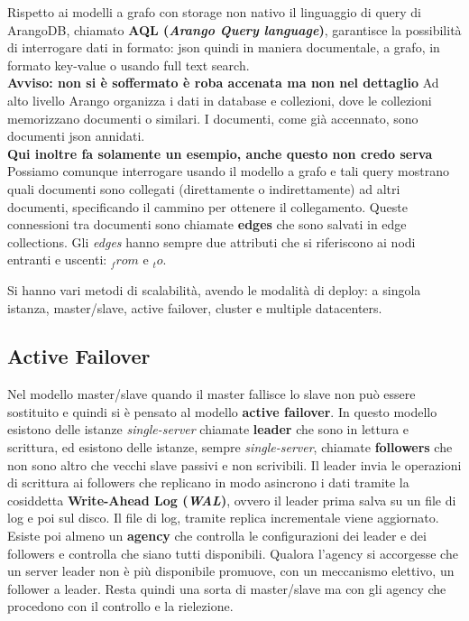 Rispetto ai modelli a grafo con storage non nativo il linguaggio di query di ArangoDB, chiamato \textbf{AQL (\textit{Arango Query language})}, garantisce la possibilità di interrogare dati in formato: json quindi in maniera documentale, a grafo, in formato key-value o  usando full text search. \\

\textbf{Avviso: non si è soffermato è roba accenata ma non nel dettaglio}
Ad alto livello Arango organizza i dati in database e collezioni, dove le collezioni memorizzano documenti o similari. I documenti, come già accennato, sono documenti json annidati.\\
\textbf{Qui inoltre fa solamente un esempio, anche questo non credo serva}\\
Possiamo comunque interrogare usando il modello a grafo e tali query mostrano quali documenti sono collegati (direttamente o indirettamente) ad altri documenti, specificando il cammino per ottenere il collegamento. Queste connessioni tra documenti sono chiamate \textbf{edges} che sono salvati in edge collections. Gli \textit{edges} hanno sempre due attributi che si riferiscono ai nodi entranti e uscenti: $_from $ e $_to$.

Si hanno vari metodi di scalabilità, avendo le modalità di deploy: a singola istanza, master/slave, active failover, cluster e multiple datacenters.

\subsection{Active Failover}
Nel modello master/slave quando il master fallisce lo slave non può essere sostituito e quindi si è pensato al modello \textbf{active failover}. 
In questo modello esistono delle istanze \textit{single-server} chiamate \textbf{leader} che sono in lettura e scrittura, ed esistono delle istanze, sempre \textit{single-server}, chiamate \textbf{followers} che non sono altro che vecchi slave passivi e non scrivibili.
Il leader invia le operazioni di scrittura ai followers che replicano in modo asincrono i dati tramite la cosiddetta \textbf{Write-Ahead Log (\textit{WAL})}, ovvero il leader prima salva su un file di log e poi sul disco. Il file di log, tramite replica incrementale viene aggiornato. \\
Esiste poi almeno un \textbf{agency} che controlla le configurazioni dei leader e dei followers e controlla che siano tutti disponibili. Qualora l'agency si accorgesse che un server leader non è più disponibile promuove, con un meccanismo elettivo, un follower a leader. Resta quindi una sorta di master/slave ma con gli agency che procedono con il controllo e la rielezione.

